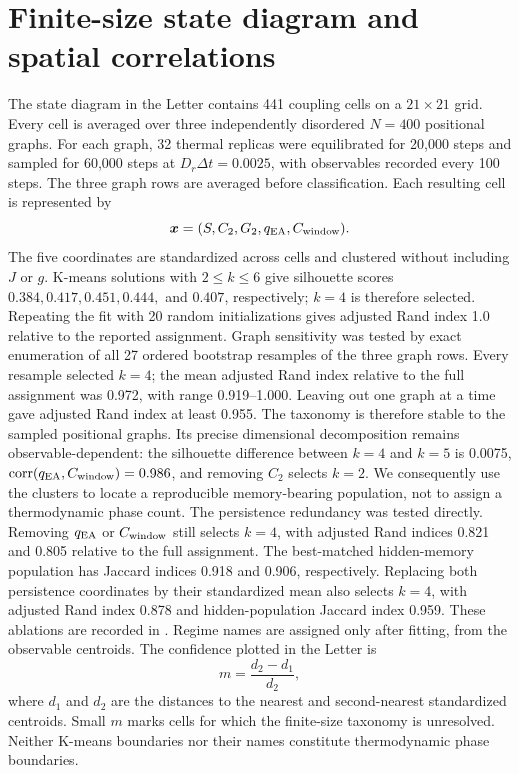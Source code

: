 \documentclass[aps,prl,onecolumn,superscriptaddress,nofootinbib]{revtex4-2}
\begin{document}
\section{Finite-size state diagram and spatial correlations}

The state diagram in the Letter contains 441 coupling cells on a
\(21\times21\) grid.  Every cell is averaged over three independently
disordered \(N=400\) positional graphs.  For each graph, 32 thermal replicas
were equilibrated for 20,000 steps and sampled for 60,000 steps at
\(D_r\Delta t=0.0025\), with observables recorded every 100 steps.  The three
graph rows are averaged before classification.  Each resulting cell is
represented by
\begin{equation}
 \bm x=(S,C_2,G_2,q_{\rm EA},C_{\rm window}).
\end{equation}
The five coordinates are standardized across cells and clustered without
including \(J\) or \(g\).  K-means solutions with \(2\leq k\leq6\) give
silhouette scores \(0.384,0.417,0.451,0.444,\) and \(0.407\),
respectively; \(k=4\) is therefore selected.  Repeating the fit with 20
random initializations gives adjusted Rand index 1.0 relative to the
reported assignment.  Graph sensitivity was tested by exact enumeration of
all 27 ordered bootstrap resamples of the three graph rows.  Every resample
selected \(k=4\); the mean adjusted Rand index relative to the full
assignment was 0.972, with range 0.919--1.000.  Leaving out one graph at a
time gave adjusted Rand index at least 0.955.  The taxonomy is therefore
stable to the sampled positional graphs.  Its precise dimensional
decomposition remains observable-dependent: the silhouette difference
between \(k=4\) and \(k=5\) is 0.0075,
\(\operatorname{corr}(q_{\rm EA},C_{\rm window})=0.986\), and removing
\(C_2\) selects \(k=2\).  We consequently use the clusters to locate a
reproducible memory-bearing population, not to assign a thermodynamic phase
count. The persistence redundancy was tested directly. Removing
\(q_{\rm EA}\) or \(C_{\rm window}\) still selects \(k=4\), with adjusted
Rand indices 0.821 and 0.805 relative to the full assignment. The best-matched
hidden-memory population has Jaccard indices 0.918 and 0.906, respectively.
Replacing both persistence coordinates by their standardized mean also
selects \(k=4\), with adjusted Rand index 0.878 and hidden-population Jaccard
index 0.959. These ablations are recorded in
. Regime names are assigned only after fitting, from
the observable centroids.  The confidence plotted in the Letter is
\begin{equation}
 m=\frac{d_2-d_1}{d_2},
\end{equation}
where \(d_1\) and \(d_2\) are the distances to the nearest and
second-nearest standardized centroids.  Small \(m\) marks cells for which
the finite-size taxonomy is unresolved.  Neither K-means boundaries nor
their names constitute thermodynamic phase boundaries.
\end{document}
